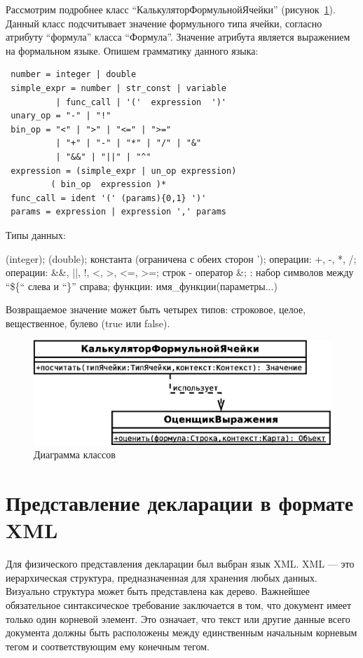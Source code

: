 \documentclass[14pt,a4paper]{reportmod}
\begin{document}
Рассмотрим подробнее класс ``КалькуляторФормульнойЯчейки'' (рисунок~\ref{pic:classes_4}). Данный класс подсчитывает значение формульного типа ячейки, согласно атрибуту ``формула'' класса ``Формула''. Значение атрибута является выражением на формальном языке. Опишем грамматику данного языка:

\begin{verbatim}
 number = integer | double
 simple_expr = number | str_const | variable
          | func_call | '('  expression  ')'
 unary_op = "-" | "!"
 bin_op = "<" | ">" | "<=" | ">="
          | "+" | "-" | "*" | "/" | "&"
          | "&&" | "||" | "^"
 expression = (simple_expr | un_op expression)
         ( bin_op  expression )*
 func_call = ident '(' (params){0,1} ')'
 params = expression | expression ',' params
\end{verbatim}

Типы данных:
\begin{itemize}
  (integer);
  (double);
   константа (ограничена с обеих сторон ');
   операции: +, -, *, /;
   операции: \&\&, ||, !, <, >, <=, >=;
   строк - оператор \&;
  : набор символов между ``\$\{`` слева и ``\}'' справа;
   функции: имя\_функции(параметры...)
\end{itemize}

Возвращаемое значение может быть четырех типов: строковое, целое, вещественное, булево (true или false).

\begin{figure}
  \centering
  \includegraphics[scale=0.4]{uml/_classes_4}
  \caption{Диаграмма классов}
  \label{pic:classes_4}
\end{figure}

\section{Представление декларации в формате XML}
Для физического представления декларации был выбран язык XML. XML — это иерархическая структура, предназначенная для хранения любых данных. Визуально структура может быть представлена как дерево. Важнейшее обязательное синтаксическое требование заключается в том, что документ имеет только один корневой элемент. Это означает, что текст или другие данные всего документа должны быть расположены между единственным начальным корневым тегом и соответствующим ему конечным тегом.
\end{document}
